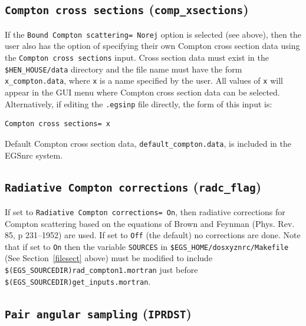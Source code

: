 \documentclass[12pt,twoside]{article}      %
\begin{document}
\subsection{ {\tt Compton cross sections} ({\tt comp\_xsections})}

If the {\tt Bound Compton scattering= Norej} option is selected (see above), then
the user also has the option of
specifying their own Compton cross section data
using the {\tt Compton cross sections} input.  Cross section data must exist
in the {\tt \$HEN\_HOUSE/data} directory and the file name must have
the form {\tt x\_compton.data}, where {\tt x} is a name
specified by the user.  All values of {\tt x} will appear in the GUI menu where Compton
cross section data can be selected.  Alternatively, if editing
the {\tt .egsinp} file directly, the form of this input is:
\begin{verbatim}
Compton cross sections= x
\end{verbatim}
Default Compton cross section
data, {\tt default\_compton.data}, is included in
the EGSnrc system.

\subsection{{\tt Radiative Compton corrections} ({\tt radc\_flag})}

If set to {\tt Radiative Compton corrections= On}, then radiative
corrections for Compton scattering based on the equations
of Brown and Feynman (Phys. Rev. 85, p 231--1952) are used.
If set to {\tt Off} (the default) no corrections are done.
Note that if set to {\tt On} then the variable {\tt SOURCES} in
{\tt \$EGS\_HOME/dosxyznrc/Makefile} (See Section~\ref{filesect} above)
must be modified to include {\tt \$(EGS\_SOURCEDIR)rad\_compton1.mortran} just
before {\tt \$(EGS\_SOURCEDIR)get\_inputs.mortran}.

\subsection{{\tt Pair angular sampling} ({\tt IPRDST})}
\end{document}
